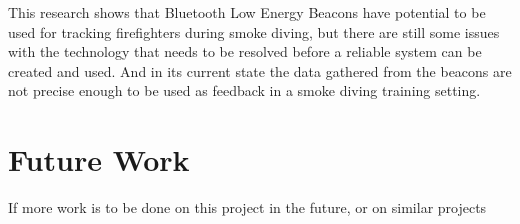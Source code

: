 \documentclass[../Main/thesis.tex]{subfiles}
\begin{document}
This research shows that Bluetooth Low Energy Beacons have potential to be used for tracking firefighters during smoke diving, but there are still some issues with the technology that needs to be resolved before a reliable system can be created and used.
And in its current state the data gathered from the beacons are not precise enough to be used as feedback in a smoke diving training setting.

\section{Future Work}
If more work is to be done on this project in the future, or on similar projects 
\end{document}
